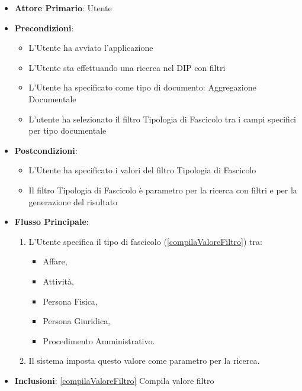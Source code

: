 \begin{itemize}
      \item \textbf{Attore Primario}: Utente
      \item \textbf{Precondizioni}: 
      \begin{itemize}
            \item L'Utente ha avviato l'applicazione
            \item L'Utente sta effettuando una ricerca nel DIP con filtri
            \item L'Utente ha specificato come tipo di documento: Aggregazione Documentale
            \item L'utente ha selezionato il filtro Tipologia di Fascicolo tra i campi specifici per tipo documentale
      \end{itemize}
      \item \textbf{Postcondizioni}: \begin{itemize}
            \item L'Utente ha specificato i valori del filtro Tipologia di Fascicolo
            \item Il filtro Tipologia di Fascicolo è parametro per la ricerca con filtri e per la generazione del risultato
      \end{itemize}
      \item \textbf{Flusso Principale}:
            \begin{enumerate}
                  \item L'Utente specifica il tipo di fascicolo (\ref{compilaValoreFiltro}) tra: \begin{itemize}
                              \item Affare,
                              \item Attività,
                              \item Persona Fisica,
                              \item Persona Giuridica,
                              \item Procedimento Amministrativo.
                        \end{itemize}
                  \item Il sistema imposta questo valore come parametro per la ricerca.
            \end{enumerate}
      \item \textbf{Inclusioni}: \ref{compilaValoreFiltro} Compila valore filtro
\end{itemize}

